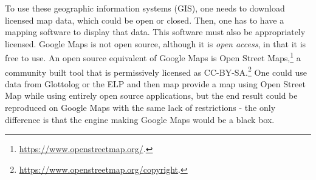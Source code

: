 To use these geographic information systems (GIS), one needs to download licensed map data, which could be open or closed. Then, one has to have a mapping software to display that data. This software must also be appropriately licensed. Google Maps is not open source, although it is {\it open access}, in that it is free to use. An open source equivalent of Google Maps is Open Street Maps,\footnote{\href{https://www.openstreetmap.org/}{https://www.openstreetmap.org/}. } a community built tool that is permissively licensed as CC-BY-SA.\footnote{\href{https://www.openstreetmap.org/copyright}{https://www.openstreetmap.org/copyright}. } One could use data from Glottolog or the ELP and then map provide a map using Open Street Map while using entirely open source applications, but the end result could be reproduced on Google Maps with the same lack of restrictions - the only difference is that the engine making Google Maps would be a black box.

